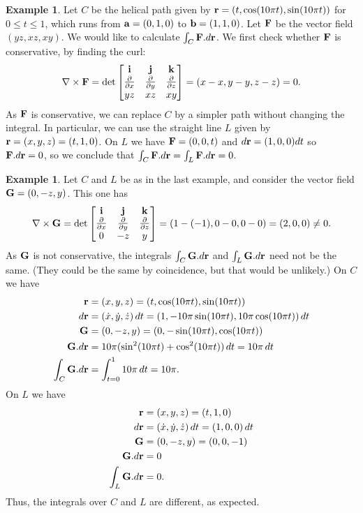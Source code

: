 \documentclass[reqno]{amsart}
\theoremstyle{definition}
\newtheorem{example}[theorem]{Example}
\begin{document}
\begin{example}\label{eg-straighten}
 Let $C$ be the helical path given by
 $\mathbf{r}=(t,\cos(10\pi t),\sin(10\pi t))$ for $0\leq t\leq 1$, which runs
 from $\mathbf{a}=(0,1,0)$ to $\mathbf{b}=(1,1,0)$.  Let $\mathbf{F}$ be the vector field
 $(yz,xz,xy)$.  We would like to calculate $\int_C\mathbf{F}.d\mathbf{r}$.  We first
 check whether $\mathbf{F}$ is conservative, by finding the curl:
 \[ \nabla\times\mathbf{F} = 
  \det\left[\begin{matrix} \mathbf{i}  & \mathbf{j}  & \mathbf{k} \\
           \frac{\partial}{\partial x} & \frac{\partial}{\partial y} & \frac{\partial}{\partial z} \\
           yz   & xz   & xy \end{matrix}\right] = 
   (x-x,y-y,z-z) = 0.
 \]
 As $\mathbf{F}$ is conservative, we can replace $C$ by a simpler path
 without changing the integral.  In particular, we can use the
 straight line $L$ given by $\mathbf{r}=(x,y,z)=(t,1,0)$.  On $L$ we have
 $\mathbf{F}=(0,0,t)$ and $d\mathbf{r}=(1,0,0)dt$ so $\mathbf{F}.d\mathbf{r}=0$, so we conclude that
 $\int_C\mathbf{F}.d\mathbf{r}=\int_L\mathbf{F}.d\mathbf{r}=0$.  
\end{example}
\begin{example}
 Let $C$ and $L$ be as in the last example, and consider the vector
 field $\mathbf{G}=(0,-z,y)$.  This one has
 \[ \nabla\times\mathbf{G} =
  \det\left[\begin{matrix} \mathbf{i}  & \mathbf{j}  & \mathbf{k} \\
           \frac{\partial}{\partial x} & \frac{\partial}{\partial y} & \frac{\partial}{\partial z} \\
           0    & -z   & y \end{matrix}\right] = 
   (1-(-1),0-0,0-0) = (2,0,0)\neq 0.
 \]
 As $\mathbf{G}$ is not conservative, the integrals $\int_C\mathbf{G}.d\mathbf{r}$ and
 $\int_L\mathbf{G}.d\mathbf{r}$ need not be the same.  (They could be the same by
 coincidence, but that would be unlikely.)  On $C$ we have
 \begin{align*}
  \mathbf{r} &= (x,y,z) = (t,\cos(10\pi t),\sin(10\pi t)) \\
  d\mathbf{r} &= (\dot{x},\dot{y},\dot{z})\,dt =
    (1,-10\pi\sin(10\pi t),10\pi\cos(10\pi t))\,dt \\
  \mathbf{G} &= (0,-z,y) = (0,-\sin(10\pi t),\cos(10\pi t)) \\
  \mathbf{G}.d\mathbf{r} &= 10\pi(\sin^2(10\pi t)+\cos^2(10\pi t))\,dt
             = 10\pi\,dt \\
  \int_C\mathbf{G}.d\mathbf{r} &= \int_{t=0}^1 10\pi\,dt = 10\pi.
 \end{align*}
 On $L$ we have
 \begin{align*}
  \mathbf{r} &= (x,y,z) = (t,1,0) \\
  d\mathbf{r} &= (\dot{x},\dot{y},\dot{z})\,dt = (1,0,0)\,dt \\
  \mathbf{G} &= (0,-z,y) = (0,0,-1) \\
  \mathbf{G}.d\mathbf{r} &= 0 \\
  \int_L\mathbf{G}.d\mathbf{r} &= 0.
 \end{align*}
 Thus, the integrals over $C$ and $L$ are different, as expected.
\end{example}
\end{document}
